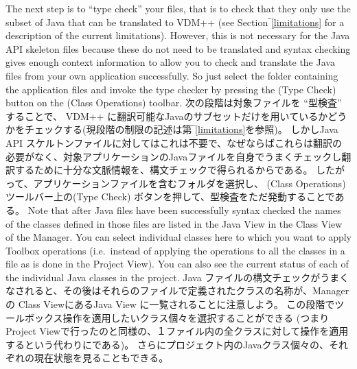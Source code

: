 \documentclass[\pformat,12pt]{jarticle}
\newcommand{\guicmd}[1]{{\sf #1}}
\begin{document}
The next step is to ``type check'' your files, that is to check that
they only use the subset of Java 
that can be translated to VDM++ (see Section‾\ref{limitations} for a
description of the current limitations). However, this is not
necessary for the Java API skeleton files because these do not need to
be translated and syntax checking gives enough context information to
allow you to check and translate the Java files from your own
application successfully. So just select the folder containing the
application files and invoke the type checker by pressing the 
(\guicmd{Type Check}) button on the (\guicmd{Class Operations})
toolbar. 
次の段階は対象ファイルを ``型検査'' することで、 VDM++ に翻訳可能なJavaのサブセットだけを用いているかどうかをチェックする(現段階の制限の記述は第‾\ref{limitations}を参照)。
しかしJava API スケルトンファイルに対してはこれは不要で、なぜならばこれらは翻訳の必要がなく、対象アプリケーションのJavaファイルを自身でうまくチェックし翻訳するために十分な文脈情報を、構文チェックで得られるからである。
したがって、アプリケーションファイルを含むフォルダを選択し、 (\guicmd{Class Operations})ツールバー上の(\guicmd{Type Check}) ボタンを押して、型検査をただ発動することである。
Note that after Java files have been successfully syntax checked the
names of the classes defined in those files are listed in the
\guicmd{Java View} in the \guicmd{Class View} of the
\guicmd{Manager}. You can select individual classes here to which you
want to apply Toolbox operations (i.e.\ instead of applying the
operations to all the classes in a file as is done in the
\guicmd{Project View}). You can also see the current status of each of
the individual Java classes in the project. 
Java ファイルの構文チェックがうまくなされると、その後はそれらのファイルで定義されたクラスの名称が、\guicmd{Manager}の \guicmd{Class View}にある\guicmd{Java View} に一覧されることに注意しよう。
この段階でツールボックス操作を適用したいクラス個々を選択することができる (つまり\guicmd{Project View}で行ったのと同様の、１ファイル内の全クラスに対して操作を適用するという代わりにである)。 
さらにプロジェクト内のJavaクラス個々の、それぞれの現在状態を見ることもできる。
\end{document}
